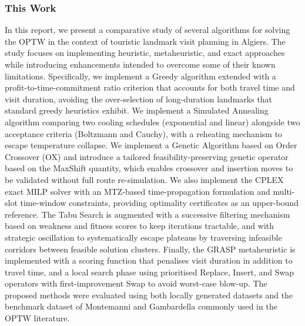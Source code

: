 \subsubsection*{This Work}

In this report, we present a comparative study of several algorithms for solving the OPTW in the context of touristic landmark visit planning in Algiers. The study focuses on implementing heuristic, metaheuristic, and exact approaches while introducing enhancements intended to overcome some of their known limitations. Specifically, we implement a Greedy algorithm extended with a profit-to-time-commitment ratio criterion that accounts for both travel time and visit duration, avoiding the over-selection of long-duration landmarks that standard greedy heuristics exhibit. We implement a Simulated Annealing algorithm comparing two cooling schedules (exponential and linear) alongside two acceptance criteria (Boltzmann and Cauchy), with a reheating mechanism to escape temperature collapse. We implement a Genetic Algorithm based on Order Crossover (OX) and introduce a tailored feasibility-preserving genetic operator based on the MaxShift quantity, which enables crossover and insertion moves to be validated without full route re-simulation. We also implement the CPLEX exact MILP solver with an MTZ-based time-propagation formulation and multi-slot time-window constraints, providing optimality certificates as an upper-bound reference. The Tabu Search is augmented with a successive filtering mechanism based on weakness and fitness scores to keep iterations tractable, and with strategic oscillation to systematically escape plateaus by traversing infeasible corridors between feasible solution clusters. Finally, the GRASP metaheuristic is implemented with a scoring function that penalises visit duration in addition to travel time, and a local search phase using prioritised Replace, Insert, and Swap operators with first-improvement Swap to avoid worst-case blow-up. The proposed methods were evaluated using both locally generated datasets and the benchmark dataset of Montemanni and Gambardella commonly used in the OPTW literature.